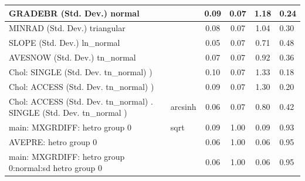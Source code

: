 \begin{table}
\begin{center}
\begin{tabular}{|l|l|c|c|c|l|}
			\hline
			GRADEBR (Std. Dev.) normal &  & 0.09 & 0.07 & 1.18 & 0.24 \\
			\hline
			MINRAD (Std. Dev.) triangular &  & 0.08 & 0.07 & 1.04 & 0.30 \\
			\hline
			SLOPE (Std. Dev.) ln_normal &  & 0.05 & 0.07 & 0.71 & 0.48 \\
			\hline
			AVESNOW (Std. Dev.) tn_normal &  & 0.07 & 0.07 & 0.92 & 0.36 \\
			\hline
			 Chol: SINGLE (Std. Dev. tn_normal) ) &  & 0.10 & 0.07 & 1.33 & 0.18 \\
			\hline
			 Chol: ACCESS (Std. Dev. tn_normal) ) &  & 0.09 & 0.07 & 1.30 & 0.20 \\
			\hline
			 Chol: ACCESS (Std. Dev. tn_normal) . SINGLE (Std. Dev.   tn_normal ) & arcsinh & 0.06 & 0.07 & 0.80 & 0.42 \\
			\hline
			main: MXGRDIFF: hetro group 0 & sqrt & 0.09 & 1.00 & 0.09 & 0.93 \\
			\hline
			AVEPRE: hetro group 0 &  & 0.06 & 1.00 & 0.06 & 0.95 \\
			\hline
			main: MXGRDIFF: hetro group 0:normal:sd  hetro group 0 &  & 0.06 & 1.00 & 0.06 & 0.95 \\
			\hline
		\end{tabular}
	\end{center}
\end{table}